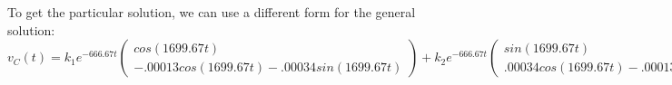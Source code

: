 \documentclass[preview]{standalone}
\begin{document}
\begin{center}
To get the particular solution, we can use a different form for the general solution: 
                 \[
                        v_C(t) = k_1e^{-666.67t}
                        \begin{pmatrix} 
                        cos(1699.67t) \\ 
                        -.00013cos(1699.67t) - .00034sin(1699.67t)
                        \end{pmatrix} + k_2e^{-666.67t}
                        \begin{pmatrix} 
                        sin(1699.67t) \\ 
                        .00034cos(1699.67t) - .00013sin(1699.67t)
                        \end{pmatrix}
                \]
\end{center}
\end{document}

